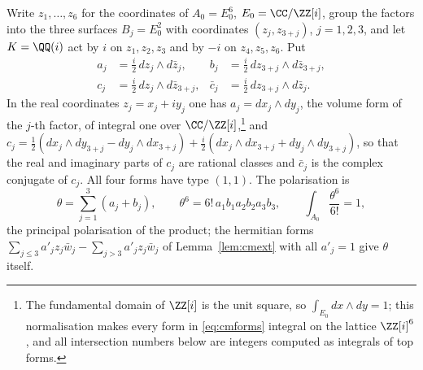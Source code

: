 Write $z_{1},\dots,z_{6}$ for the coordinates of $A_{0}=E_{0}^{6}$, $E_{0}=\CC/\ZZ[i]$, group the factors into the three surfaces $B_{j}=E_{0}^{2}$ with coordinates $(z_{j},z_{3+j})$, $j=1,2,3$, and let $K=\QQ(i)$ act by $i$ on $z_{1},z_{2},z_{3}$ and by $-i$ on $z_{4},z_{5},z_{6}$. Put
\begin{equation}\label{eq:cmforms}
\begin{aligned}
a_{j}&=\tfrac{i}{2}\,dz_{j}\wedge d\bar z_{j}, &
b_{j}&=\tfrac{i}{2}\,dz_{3+j}\wedge d\bar z_{3+j},\\
c_{j}&=\tfrac{i}{2}\,dz_{j}\wedge d\bar z_{3+j}, &
\bar c_{j}&=\tfrac{i}{2}\,dz_{3+j}\wedge d\bar z_{j}.
\end{aligned}
\end{equation}
In the real coordinates $z_{j}=x_{j}+iy_{j}$ one has $a_{j}=dx_{j}\wedge dy_{j}$, the volume form of the $j$-th factor, of integral one over $\CC/\ZZ[i]$,\footnote{The fundamental domain of $\ZZ[i]$ is the unit square, so $\int_{E_{0}}dx\wedge dy=1$; this normalisation makes every form in \eqref{eq:cmforms} integral on the lattice $\ZZ[i]^{6}$, and all intersection numbers below are integers computed as integrals of top forms.} and $c_{j}=\tfrac12(dx_{j}\wedge dy_{3+j}-dy_{j}\wedge dx_{3+j})+\tfrac{i}{2}(dx_{j}\wedge dx_{3+j}+dy_{j}\wedge dy_{3+j})$, so that the real and imaginary parts of $c_{j}$ are rational classes and $\bar c_{j}$ is the complex conjugate of $c_{j}$. All four forms have type $(1,1)$. The polarisation is
\begin{equation}\label{eq:cmtheta}
\theta=\sum_{j=1}^{3}(a_{j}+b_{j}),\qquad \theta^{6}=6!\,a_{1}b_{1}a_{2}b_{2}a_{3}b_{3},\qquad \int_{A_{0}}\frac{\theta^{6}}{6!}=1,
\end{equation}
the principal polarisation of the product; the hermitian forms $\sum_{j\le3}a'_{j}z_{j}\bar w_{j}-\sum_{j>3}a'_{j}z_{j}\bar w_{j}$ of Lemma~\ref{lem:cmext} with all $a'_{j}=1$ give $\theta$ itself.

